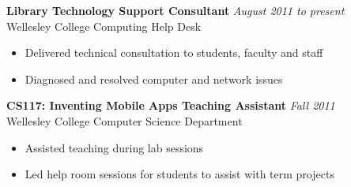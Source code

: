\documentclass[margin,line]{resume}
\begin{document}
\begin{resume}
	\textbf{Library Technology Support Consultant} \hfill \textsl{August 2011 to present}\vspace{1mm}\\%
	Wellesley College Computing Help Desk\vspace{0mm}\\\vspace{-2mm}%
	\begin{itemize}
	\item Delivered technical consultation to students, faculty and staff
	\item Diagnosed and resolved computer and network issues\vspace{1mm}\\%
	\end{itemize}
	
	\textbf{CS117: Inventing Mobile Apps Teaching Assistant} \hfill \textsl{Fall 2011}\vspace{1mm}\\%
	Wellesley College Computer Science Department\vspace{0mm}\\\vspace{-2mm}%
	\begin{itemize}
	\item Assisted teaching during lab sessions
	\item Led help room sessions for students to assist with term projects\vspace{1mm}\\%
	\end{itemize}
	
\end{resume}
\end{document}
